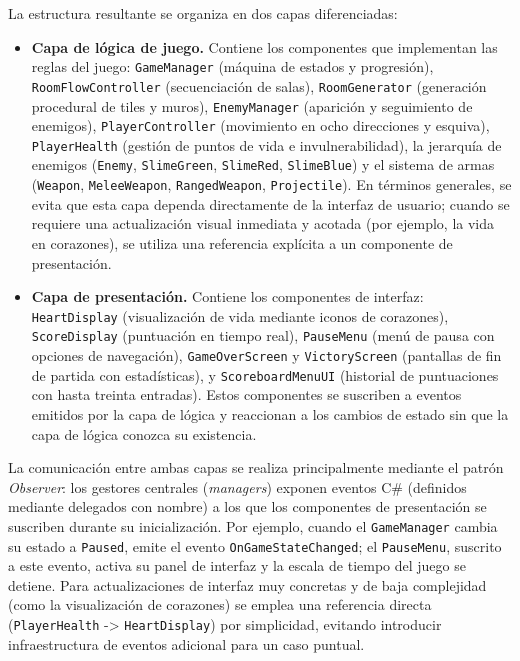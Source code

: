 La estructura resultante se organiza en dos capas diferenciadas:

\begin{itemize}
\item \textbf{Capa de lógica de juego.} Contiene los componentes que implementan las reglas del juego: \texttt{GameManager} (máquina de estados y progresión), \texttt{RoomFlowController} (secuenciación de salas), \texttt{RoomGenerator} (generación procedural de tiles y muros), \texttt{EnemyManager} (aparición y seguimiento de enemigos), \texttt{PlayerController} (movimiento en ocho direcciones y esquiva), \texttt{PlayerHealth} (gestión de puntos de vida e invulnerabilidad), la jerarquía de enemigos (\texttt{Enemy}, \texttt{SlimeGreen}, \texttt{SlimeRed}, \texttt{SlimeBlue}) y el sistema de armas (\texttt{Weapon}, \texttt{MeleeWeapon}, \texttt{RangedWeapon}, \texttt{Projectile}). En términos generales, se evita que esta capa dependa directamente de la interfaz de usuario; cuando se requiere una actualización visual inmediata y acotada (por ejemplo, la vida en corazones), se utiliza una referencia explícita a un componente de presentación.
\item \textbf{Capa de presentación.} Contiene los componentes de interfaz: \texttt{HeartDisplay} (visualización de vida mediante iconos de corazones), \texttt{ScoreDisplay} (puntuación en tiempo real), \texttt{PauseMenu} (menú de pausa con opciones de navegación), \texttt{GameOverScreen} y \texttt{VictoryScreen} (pantallas de fin de partida con estadísticas), y \texttt{ScoreboardMenuUI} (historial de puntuaciones con hasta treinta entradas). Estos componentes se suscriben a eventos emitidos por la capa de lógica y reaccionan a los cambios de estado sin que la capa de lógica conozca su existencia.
\end{itemize}

La comunicación entre ambas capas se realiza principalmente mediante el patrón \textit{Observer}: los gestores centrales (\textit{managers}) exponen eventos C\# (definidos mediante delegados con nombre) a los que los componentes de presentación se suscriben durante su inicialización. Por ejemplo, cuando el \texttt{GameManager} cambia su estado a \texttt{Paused}, emite el evento \texttt{OnGameStateChanged}; el \texttt{PauseMenu}, suscrito a este evento, activa su panel de interfaz y la escala de tiempo del juego se detiene. Para actualizaciones de interfaz muy concretas y de baja complejidad (como la visualización de corazones) se emplea una referencia directa (\texttt{PlayerHealth} -> \texttt{HeartDisplay}) por simplicidad, evitando introducir infraestructura de eventos adicional para un caso puntual.

